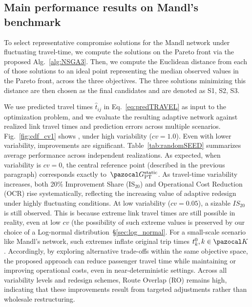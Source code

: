 \documentclass[a4paper,fleqn]{cas-sc}
\begin{document}
\subsection{Main performance results on Mandl's benchmark}\label{sec:mandl_RESULT1}

To select representative compromise solutions for the Mandl network under fluctuating travel-time, we compute the solutions on the Pareto front via the proposed Alg.~\ref{alg:NSGA3}. 
Then, we compute the Euclidean distance from each of those solutions to an ideal point representing the median observed values in the Pareto front, across the three objectives. The three solutions minimizing this distance are then chosen as the final candidates and are denoted as S1, S2, S3.

We use predicted travel times $\hat{t}_{ij}$ in Eq.~\eqref{eq:predTRAVEL} as input to the optimization problem, and we evaluate the resulting adaptive network against realized link travel times and prediction errors across multiple scenarios.
%
Fig.~\ref{fig:cdf_cv1} shows , under high variability ($cv=1.0$).
Even with lower variability, improvements are significant.
Table~\ref{tab:randomSEED} summarizes average performance across  independent realizations.
As expected, when variability is $\textit{cv}=0$, the central reference point (described in the previous paragraph) corresponds exactly to~$\pazocal G_\text{PT}^\text{static}$. 
As travel-time variability increases, both 20\% Improvement Share (IS$_{20}$) and Operational Cost Reduction (OCR) rise systematically, reflecting the increasing value of adaptive redesign under highly fluctuating conditions.
At low variability ($cv=0.05$), a sizable $IS_{20}$ is still observed. This is because extreme link travel times are still possible in reality, even at low $cv$ (the possibility of such extreme values is preserved by our choice of a Log-normal distribution~\S{}\ref{sec:log_normal}. For a small-scale scenario like Mandl’s network, such extremes inflate original trip times $t_k^0, k\in\pazocal K$.
Accordingly, by exploring alternative trade-offs within the same objective space, the proposed approach can reduce passenger travel time while maintaining or improving operational costs, even in near-deterministic settings.
%
Across all variability levels and redesign schemes, Route Overlap (RO) remains high, indicating that these improvements result from targeted adjustments rather than wholesale restructuring. 
\end{document}
